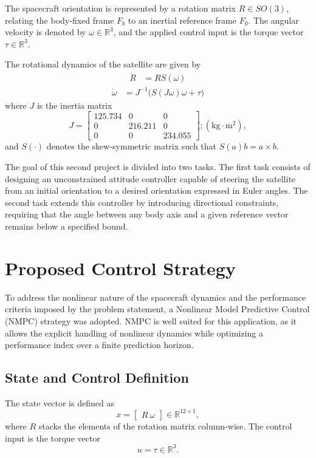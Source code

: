 \documentclass{article}
\begin{document}
The spacecraft orientation is represented by a rotation matrix $R \in SO(3)$, relating the body-fixed frame $F_b$ to an inertial reference frame $F_0$. The angular velocity is denoted by $\omega \in \mathbb{R}^3$, and the applied control input is the torque vector $\tau \in \mathbb{R}^3$.

The rotational dynamics of the satellite are given by
\begin{align}
    \dot{R} &= R S(\omega)
\end{align}
\begin{align}
    \dot{\omega} &= J^{-1} \big(S(J \omega) \omega + \tau\big)
\end{align}
where $J$ is the inertia matrix
\begin{equation}
J = \begin{bmatrix}
125.734 & 0 & 0 \\
0 & 216.211 & 0 \\
0 & 0 & 234.055
\end{bmatrix} ; (\text{kg}\cdot\text{m}^2),
\end{equation}
and $S(\cdot)$ denotes the skew-symmetric matrix such that $S(a)b = a \times b$.

The goal of this second project is divided into two tasks. The first task consists of designing an unconstrained attitude controller capable of steering the satellite from an initial orientation to a desired orientation expressed in Euler angles. The second task extends this controller by introducing directional constraints, requiring that the angle between any body axis and a given reference vector remains below a specified bound.

\section{Proposed Control Strategy}

To address the nonlinear nature of the spacecraft dynamics and the performance criteria imposed by the problem statement, a Nonlinear Model Predictive Control (NMPC) strategy was adopted. NMPC is well suited for this application, as it allows the explicit handling of nonlinear dynamics while optimizing a performance index over a finite prediction horizon.

\subsection{State and Control Definition}

The state vector is defined as
\begin{equation}
x = \begin{bmatrix} R \ \omega \end{bmatrix} \in \mathbb{R}^{12\times 1},
\end{equation}
where $R$ stacks the elements of the rotation matrix column-wise. The control input is the torque vector
\begin{equation}
u = \tau \in \mathbb{R}^3.
\end{equation}
\end{document}
